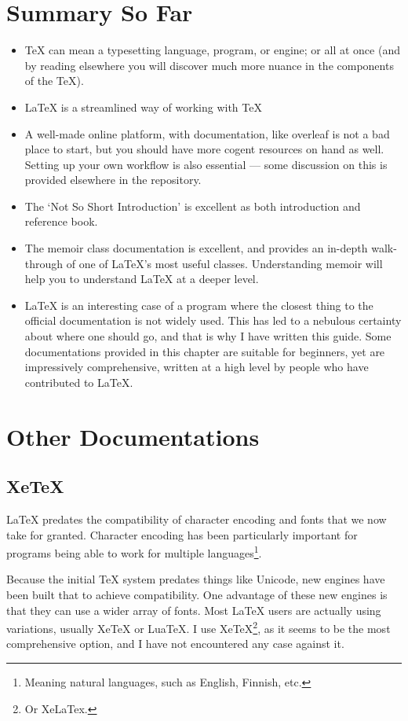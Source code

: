 \documentclass[11pt, oneside]{memoir}
\begin{document}
\section{Summary So Far}
\begin{itemize}
\item \TeX{} can mean a typesetting language, program, or engine; or all at once (and by reading elsewhere you will discover much more nuance in the components of the \TeX{}).
\item \LaTeX{} is a streamlined way of working with \TeX{} 
\item A well-made online platform, with documentation, like overleaf is not a bad place to start, but you should have more cogent resources on hand as well. Setting up your own workflow is also essential — some discussion on this is provided elsewhere in the repository.
\item The `Not So Short Introduction' is excellent as both introduction and reference book.
\item The memoir class documentation is excellent, and provides an in-depth walk-through of one of LaTeX's most useful classes. Understanding memoir will help you to understand LaTeX at a deeper level.
\item \LaTeX{} is an interesting case of a program where the closest thing to the official documentation is not widely used. This has led to a nebulous certainty about where one should go, and that is why I have written this guide. Some documentations provided in this chapter are suitable for beginners, yet are impressively comprehensive, written at a high level by people who have contributed to LaTeX.
\end{itemize}

\section{Other Documentations}
\subsection{XeTeX}

LaTeX predates the compatibility of character encoding and fonts that we now take for granted. Character encoding has been particularly important for programs being able to work for multiple languages\footnote{Meaning natural languages, such as English, Finnish, etc.}.

Because the initial TeX system predates things like Unicode, new engines have been built that to achieve compatibility. One advantage of these new engines is that they can use a wider array of fonts. Most LaTeX users are actually using variations, usually XeTeX or LuaTeX. I use XeTeX\footnote{Or XeLaTex.}, as it seems to be the most comprehensive option, and I have not encountered any case against it.
\end{document}
